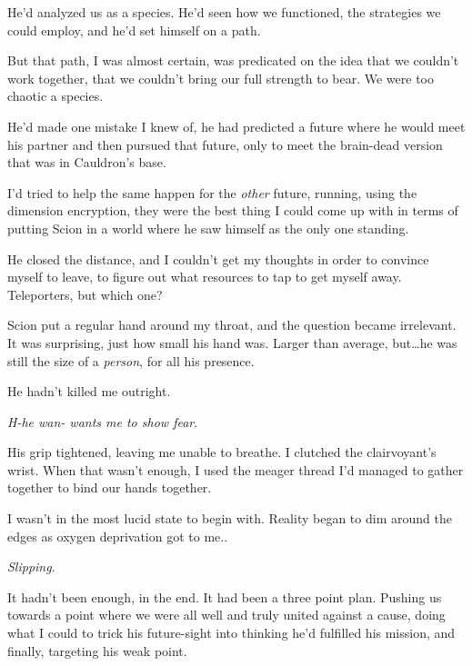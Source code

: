 He'd analyzed us as a species.  He'd seen how we functioned, the strategies we could employ, and he'd set himself on a path.



But that path, I was almost certain, was predicated on the idea that we couldn't work together, that we couldn't bring our full strength to bear.  We were too chaotic a species.



He'd made one mistake I knew of, he had predicted a future where he would meet his partner and then pursued that future, only to meet the brain-dead version that was in Cauldron's base.



I'd tried to help the same happen for the \emph{other} future, running, using the dimension encryption, they were the best thing I could come up with in terms of putting Scion in a world where he saw himself as the only one standing.



He closed the distance, and I couldn't get my thoughts in order to convince myself to leave, to figure out what resources to tap to get myself away.  Teleporters, but which one?



Scion put a regular hand around my throat, and the question became irrelevant.  It was surprising, just how small his hand was.  Larger than average, but\ldots he was still the size of a \emph{person}, for all his presence.



He hadn't killed me outright.



\emph{H-he wan- wants me to show fear}.



His grip tightened, leaving me unable to breathe.  I clutched the clairvoyant's wrist.  When that wasn't enough, I used the meager thread I'd managed to gather together to bind our hands together.



I wasn't in the most lucid state to begin with.  Reality began to dim around the edges as oxygen deprivation got to me..



\emph{Slipping}.



It hadn't been enough, in the end.  It had been a three point plan.  Pushing us towards a point where we were all well and truly united against a cause, doing what I could to trick his future-sight into thinking he'd fulfilled his mission, and finally, targeting his weak point.



